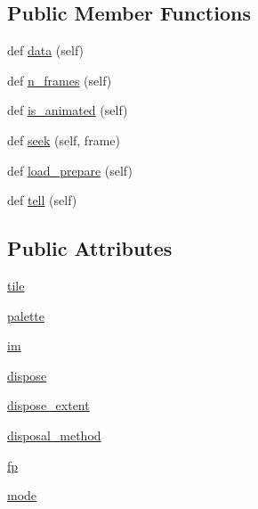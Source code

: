 \subsection*{Public Member Functions}
\begin{DoxyCompactItemize}
\item 
def \hyperlink{classPIL_1_1GifImagePlugin_1_1GifImageFile_a37575432ca65b572fd988a4803bc4d9d}{data} (self)
\item 
def \hyperlink{classPIL_1_1GifImagePlugin_1_1GifImageFile_a3d8022ff3618808ef43dad69d4836c27}{n\+\_\+frames} (self)
\item 
def \hyperlink{classPIL_1_1GifImagePlugin_1_1GifImageFile_a99495da3893f68aee2eeb1cc7a059b4b}{is\+\_\+animated} (self)
\item 
def \hyperlink{classPIL_1_1GifImagePlugin_1_1GifImageFile_acbb15a8e96f4821b3dd476becabb639f}{seek} (self, frame)
\item 
def \hyperlink{classPIL_1_1GifImagePlugin_1_1GifImageFile_a082fb5c1d1ca1498955f4d7c4d61a161}{load\+\_\+prepare} (self)
\item 
def \hyperlink{classPIL_1_1GifImagePlugin_1_1GifImageFile_a11223e8e5ac1836664c2a450c489a107}{tell} (self)
\end{DoxyCompactItemize}
\subsection*{Public Attributes}
\begin{DoxyCompactItemize}
\item 
\hyperlink{classPIL_1_1GifImagePlugin_1_1GifImageFile_a48f40b45d0b65fae055df54674f9605b}{tile}
\item 
\hyperlink{classPIL_1_1GifImagePlugin_1_1GifImageFile_a912db36e1248528d6f285c22f15b3a3a}{palette}
\item 
\hyperlink{classPIL_1_1GifImagePlugin_1_1GifImageFile_a4fdb36edf1e394851ed2bc01f1c6b03d}{im}
\item 
\hyperlink{classPIL_1_1GifImagePlugin_1_1GifImageFile_a089757c19c2169fc6a8f786d21ce15f5}{dispose}
\item 
\hyperlink{classPIL_1_1GifImagePlugin_1_1GifImageFile_aca342c80c1781cab20c10556a5702c6c}{dispose\+\_\+extent}
\item 
\hyperlink{classPIL_1_1GifImagePlugin_1_1GifImageFile_af12c4d622c14ec45f3b284cd1858cf54}{disposal\+\_\+method}
\item 
\hyperlink{classPIL_1_1GifImagePlugin_1_1GifImageFile_a17a5473963037b954006d0e565cd23b5}{fp}
\item 
\hyperlink{classPIL_1_1GifImagePlugin_1_1GifImageFile_a0cf5afccbd2f14823ab8c027b6d330c5}{mode}
\end{DoxyCompactItemize}
